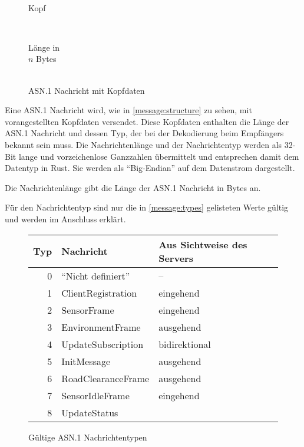 \begin{wrapfigure}{R}[-1.5em]{.5\textwidth}
	\centering
	\begin{bytefield}[bitwidth=.45em,bitheight=.7em]{32}
		 \\
		
		\begin{rightwordgroup}{Kopf}
			 \\
		\end{rightwordgroup} \\
		
		\begin{rightwordgroup}{Länge in\\\textbf{$n$} Bytes}
			 \\
			\skippedwords \\
		\end{rightwordgroup}
	\end{bytefield}
	\caption{ASN.1 Nachricht mit Kopfdaten}
	\label{message:structure}
\end{wrapfigure}

Eine ASN.1 Nachricht wird, wie in \autoref{message:structure} zu sehen, mit  vorangestellten Kopfdaten versendet.
Diese Kopfdaten enthalten die Länge der ASN.1 Nachricht und dessen Typ, der bei der Dekodierung beim Empfängers bekannt sein muss.
Die Nachrichtenlänge und der Nachrichtentyp werden als 32-Bit lange und vorzeichenlose Ganzzahlen übermittelt und entsprechen damit dem Datentyp  in Rust.
Sie werden als \enquote{Big-Endian} auf dem Datenstrom dargestellt.

Die Nachrichtenlänge gibt die Länge der ASN.1 Nachricht in Bytes an.

Für den Nachrichtentyp sind nur die in \autoref{message:types} gelisteten Werte gültig und werden im Anschluss erklärt.

\begin{figure}[H]
	\centering
	\begin{tabular}{r|l|l}
		Typ & Nachricht & Aus Sichtweise des Servers \\
		\hline
		0 & \enquote{Nicht definiert} & -- \\
		1 & ClientRegistration & eingehend \\
		2 & SensorFrame & eingehend \\
		3 & EnvironmentFrame & ausgehend \\
		4 & UpdateSubscription & bidirektional \\
		5 & InitMessage & ausgehend \\
		6 & RoadClearanceFrame & ausgehend \\
		7 & SensorIdleFrame & eingehend \\
		8 & UpdateStatus & \todo{eingehend} \\
	\end{tabular}
	\caption{Gültige ASN.1 Nachrichtentypen}
	\label{message:types}
\end{figure}

